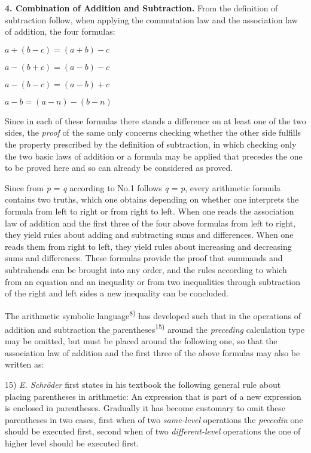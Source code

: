 \thispagestyle{fancy}

\vspace{0.5cm}

\textbf{4. Combination of Addition and Subtraction.} From the definition of subtraction follow, when applying the commutation law and the association law of addition, the four formulas:

\begin{center}
$a + (b - c) = (a + b) - c$

$a - (b + c) = (a - b) - c$

$a - (b - c) = (a - b) + c$

$a - b = (a - n) - (b - n)$
\end{center}

Since in each of these formulas there stands a difference on at least one of the two sides, the \textit{proof} of the same only concerns checking whether the other side fulfills the property prescribed by the definition of subtraction, in which checking only the two basic laws of addition or a formula may be applied that precedes the one to be proved here and so can already be considered as proved.

Since from \textit{p} = \textit{q} according to No.1 follows \textit{q} = \textit{p}, every arithmetic formula contains two truths, which one obtains depending on whether one interprets the formula from left to right or from right to left. When one reads the association law of addition and the first three of the four above formulas from left to right, they yield rules about adding and subtracting sums and differences. When one reads them from right to left, they yield rules about increasing and decreasing sums and differences. These formulas provide the proof that summands and subtrahends can be brought into any order, and the rules according to which from an equation and an inequality or from two inequalities through subtraction of the right and left sides a new inequality can be concluded.

The arithmetic symbolic language\textsuperscript{8)} has developed such that in the operations of addition and subtraction the parentheses\textsuperscript{15)} around the \textit{preceding} calculation type may be omitted, but must be placed around the following one, so that the association law of addition and the first three of the above formulas may also be written as:

\vfill
\leftline{\rule{2in}{0.4pt}}
\vspace{0.2cm}
{
\footnotesize
15) \textit{E. Schröder} first states in his textbook the following general rule about placing parentheses in arithmetic: An expression that is part of a new expression is enclosed in parentheses. Gradually it has become customary to omit these parentheses in two cases, first when of two \textit{same-level} operations the \textit{precedin} one should be executed first, second when of two \textit{different-level} operations the one of higher level should be executed first.

}
